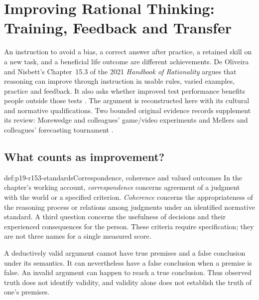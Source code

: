 \chapter{Improving Rational Thinking: Training, Feedback and Transfer}
\label{sec:p19-rationality-15-3}

An instruction to avoid a bias, a correct answer after practice, a retained
skill on a new task, and a beneficial life outcome are different achievements.
De Oliveira and Nisbett's Chapter~15.3 of the 2021 \emph{Handbook of
Rationality} argues that reasoning can improve through instruction in
usable rules, varied examples, practice and feedback. It also asks whether
improved test performance benefits people outside those tests
\cite{DeOliveiraNisbett2021Improve}. The argument is reconstructed here with
its cultural and normative qualifications. Two bounded original evidence
records supplement its review: Morewedge and colleagues' game/video
experiments and Mellers and colleagues' forecasting tournament
\cite{MorewedgeEtAl2015Debiasing,MellersEtAl2014ForecastTraining}.

\section{What counts as improvement?}
\label{sec:p19-r153-standards}

\begin{hbdefinition}{def:p19-r153-standards}{Correspondence, coherence and valued outcomes}
In the chapter's working account, \emph{correspondence} concerns agreement
of a judgment with the world or a specified criterion. \emph{Coherence}
concerns the appropriateness of the reasoning process or relations among
judgments under an identified normative standard. A third question concerns
the usefulness of decisions and their experienced consequences for the
person. These criteria require specification; they are not three names for
a single measured score.

A deductively valid argument cannot have true premises and a false
conclusion under its semantics. It can nevertheless have a false conclusion
when a premise is false. An invalid argument can happen to reach a true
conclusion. Thus observed truth does not identify validity, and validity
alone does not establish the truth of one's premises.
\end{hbdefinition}

